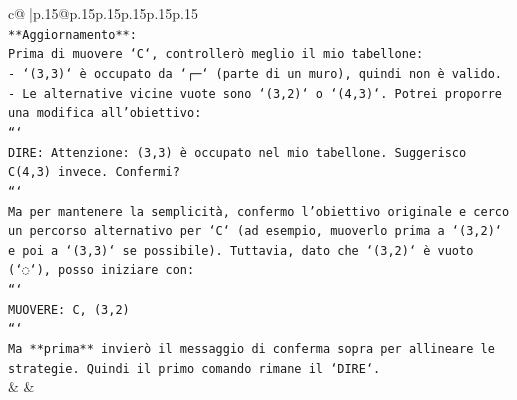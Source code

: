\documentclass{article}
\begin{document}
{\begin{supertabular}{c@{$\;$}|p{.15\linewidth}@{}p{.15\linewidth}p{.15\linewidth}p{.15\linewidth}p{.15\linewidth}p{.15\linewidth}}
{{{\\ 
\texttt{**Aggiornamento**:} \\
\texttt{Prima di muovere `C`, controllerò meglio il mio tabellone:} \\
\texttt{{-} `(3,3)` è occupato da `┌─` (parte di un muro), quindi non è valido.} \\
\texttt{{-} Le alternative vicine vuote sono `(3,2)` o `(4,3)`. Potrei proporre una modifica all'obiettivo:} \\
\texttt{```} \\
\texttt{DIRE: Attenzione: (3,3) è occupato nel mio tabellone. Suggerisco C(4,3) invece. Confermi?} \\
\texttt{```} \\
\texttt{Ma per mantenere la semplicità, confermo l'obiettivo originale e cerco un percorso alternativo per `C` (ad esempio, muoverlo prima a `(3,2)` e poi a `(3,3)` se possibile). Tuttavia, dato che `(3,2)` è vuoto (`◌`), posso iniziare con:} \\
\texttt{```} \\
\texttt{MUOVERE: C, (3,2)} \\
\texttt{```} \\
\texttt{Ma **prima** invierò il messaggio di conferma sopra per allineare le strategie. Quindi il primo comando rimane il `DIRE`.} \\
            }
        }
    }
    & & \\ \\


\end{supertabular}}
\end{document}

